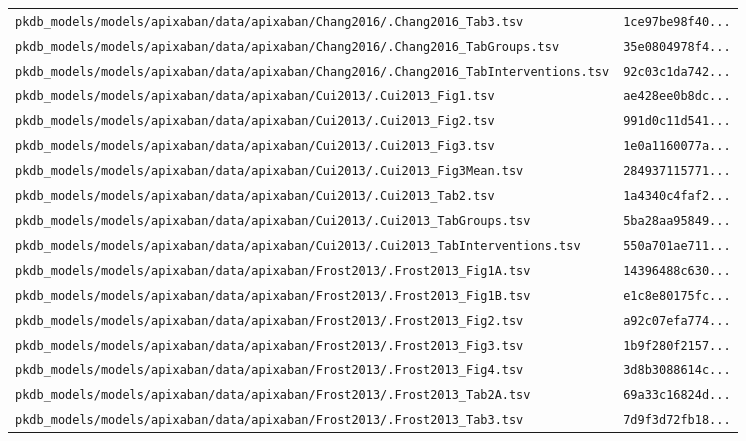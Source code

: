\documentclass{article}
\begin{document}
\begin{longtable}{ll}
\texttt{pkdb\_models/models/apixaban/data/apixaban/Chang2016/.Chang2016\_Tab3.tsv} & \texttt{1ce97be98f40...} \\
\texttt{pkdb\_models/models/apixaban/data/apixaban/Chang2016/.Chang2016\_TabGroups.tsv} & \texttt{35e0804978f4...} \\
\texttt{pkdb\_models/models/apixaban/data/apixaban/Chang2016/.Chang2016\_TabInterventions.tsv} & \texttt{92c03c1da742...} \\
\texttt{pkdb\_models/models/apixaban/data/apixaban/Cui2013/.Cui2013\_Fig1.tsv} & \texttt{ae428ee0b8dc...} \\
\texttt{pkdb\_models/models/apixaban/data/apixaban/Cui2013/.Cui2013\_Fig2.tsv} & \texttt{991d0c11d541...} \\
\texttt{pkdb\_models/models/apixaban/data/apixaban/Cui2013/.Cui2013\_Fig3.tsv} & \texttt{1e0a1160077a...} \\
\texttt{pkdb\_models/models/apixaban/data/apixaban/Cui2013/.Cui2013\_Fig3Mean.tsv} & \texttt{284937115771...} \\
\texttt{pkdb\_models/models/apixaban/data/apixaban/Cui2013/.Cui2013\_Tab2.tsv} & \texttt{1a4340c4faf2...} \\
\texttt{pkdb\_models/models/apixaban/data/apixaban/Cui2013/.Cui2013\_TabGroups.tsv} & \texttt{5ba28aa95849...} \\
\texttt{pkdb\_models/models/apixaban/data/apixaban/Cui2013/.Cui2013\_TabInterventions.tsv} & \texttt{550a701ae711...} \\
\texttt{pkdb\_models/models/apixaban/data/apixaban/Frost2013/.Frost2013\_Fig1A.tsv} & \texttt{14396488c630...} \\
\texttt{pkdb\_models/models/apixaban/data/apixaban/Frost2013/.Frost2013\_Fig1B.tsv} & \texttt{e1c8e80175fc...} \\
\texttt{pkdb\_models/models/apixaban/data/apixaban/Frost2013/.Frost2013\_Fig2.tsv} & \texttt{a92c07efa774...} \\
\texttt{pkdb\_models/models/apixaban/data/apixaban/Frost2013/.Frost2013\_Fig3.tsv} & \texttt{1b9f280f2157...} \\
\texttt{pkdb\_models/models/apixaban/data/apixaban/Frost2013/.Frost2013\_Fig4.tsv} & \texttt{3d8b3088614c...} \\
\texttt{pkdb\_models/models/apixaban/data/apixaban/Frost2013/.Frost2013\_Tab2A.tsv} & \texttt{69a33c16824d...} \\
\texttt{pkdb\_models/models/apixaban/data/apixaban/Frost2013/.Frost2013\_Tab3.tsv} & \texttt{7d9f3d72fb18...} \\

\end{longtable}
\end{document}
